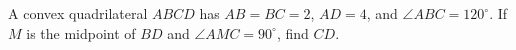 A convex quadrilateral $ ABCD $ has $ AB=BC=2 $, $ AD=4 $, and $\angle ABC=120^\circ $. If $ M $ is the midpoint of $ BD $ and $\angle AMC=90^\circ $, find $ CD $.
